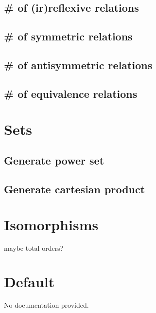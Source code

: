 \documentclass{article}
\begin{document}
\subsection{\# of (ir)reflexive relations}
\subsection{\# of symmetric relations}
\subsection{\# of antisymmetric relations}
\subsection{\# of equivalence relations}

\section{Sets}
\subsection{Generate power set}
\subsection{Generate cartesian product}

\section{Isomorphisms}
maybe total orders?

\section{Default}
No documentation provided.
\end{document}
